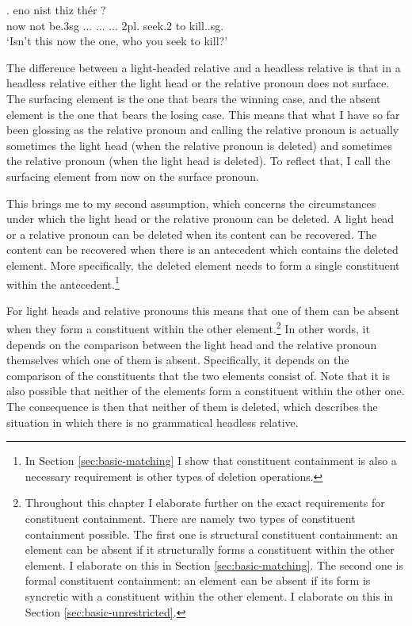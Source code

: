\exg. eno nist thiz thér     ?\\
 now {not be.3\ac{sg}} ... ...
 ... 2\ac{pl}. seek.2 to kill..\ac{sg}.\\
 `Isn't this now the one, who you seek to kill?'\label{ex:ohg-light-headed}

The difference between a light-headed relative and a headless relative is that in a headless relative either the light head or the relative pronoun does not surface.
The surfacing element is the one that bears the winning case, and the absent element is the one that bears the losing case. This means that what I have so far been glossing as the relative pronoun and calling the relative pronoun is actually sometimes the light head (when the relative pronoun is deleted) and sometimes the relative pronoun (when the light head is deleted). To reflect that, I call the surfacing element from now on the surface pronoun.

This brings me to my second assumption, which concerns the circumstances under which the light head or the relative pronoun can be deleted. A light head or a relative pronoun can be deleted when its content can be recovered. The content can be recovered when there is an antecedent which contains the deleted element. More specifically, the deleted element needs to form a single constituent within the antecedent.\footnote{
In Section \ref{sec:basic-matching} I show that constituent containment is also a necessary requirement is other types of deletion operations.
}

For light heads and relative pronouns this means that one of them can be absent when they form a constituent within the other element.\footnote{ Throughout this chapter I elaborate further on the exact requirements for constituent containment. There are namely two types of constituent containment possible. The first one is structural constituent containment: an element can be absent if it structurally forms a constituent within the other element. I elaborate on this in Section \ref{sec:basic-matching}. The second one is formal constituent containment: an element can be absent if its form is syncretic with a constituent within the other element. I elaborate on this in Section \ref{sec:basic-unrestricted}.}
In other words, it depends on the comparison between the light head and the relative pronoun themselves which one of them is absent. Specifically, it depends on the comparison of the constituents that the two elements consist of.
Note that it is also possible that neither of the elements form a constituent within the other one. The consequence is then that neither of them is deleted, which describes the situation in which there is no grammatical headless relative.

